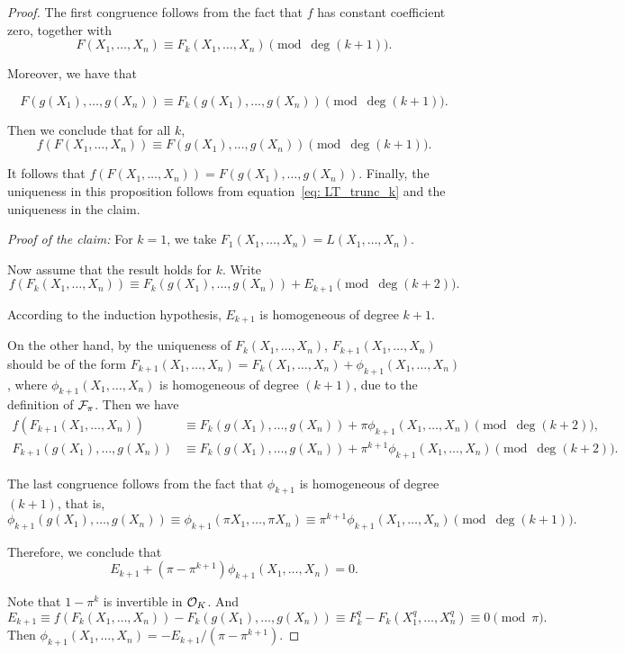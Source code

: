 \begin{proof}
    The first congruence follows from the fact that $f$ has constant coefficient zero, together with
    \begin{equation}
        F(X_1, \ldots, X_n) \equiv F_k(X_1, \ldots, X_n) \pmod{\deg (k+1)}.
        \label{eq: LT_trunc_k}
    \end{equation}

    Moreover, we have that

    \[F(g(X_1), \ldots, g(X_n)) \equiv F_k(g(X_1), \ldots, g(X_n)) \pmod{\deg (k + 1)}. \]

    Then we conclude that for all $k$,
    \[f(F(X_1, \ldots, X_n)) \equiv F(g(X_1), \ldots, g(X_n)) \pmod{\deg (k+1)}. \]

    It follows that $f(F(X_1, \ldots, X_n)) = F(g(X_1), \ldots, g(X_n))$.
    Finally, the uniqueness in this proposition follows from equation~\eqref{eq: LT_trunc_k} and the uniqueness in
    the claim.

    \textit{Proof of the claim:} For $k = 1$, we take $F_1(X_1, \ldots, X_n) = L(X_1, \ldots, X_n)$. \par
    Now assume that the result holds for $k$. Write
    \[f (F_k(X_1,\ldots, X_n )) \equiv
        F_k(g(X_1), \ldots, g(X_n)) + E_{k+1} \pmod{\deg (k+ 2)}.\]

    According to the induction hypothesis, $E_{k+1}$ is homogeneous of
    degree $k + 1$.

    On the other hand, by the uniqueness of $F_k(X_1, \ldots, X_n)$,
    $F_{k+1}(X_1,\ldots,X_n)$ should be of the form $F_{k+1}(X_1,\ldots, X_n) =
        F_k(X_1, \ldots, X_n) + \phi_{k+1}(X_1, \ldots, X_n)$, where
        $\phi_{k+1}(X_1, \ldots, X_n)$ is homogeneous of degree $(k+1)$, due to the definition of
        $\mathcal{F}_\pi$. Then we have
    \begin{align*}
        f(F_{k+1}(X_1, \ldots, X_n)) &\equiv F_k(g(X_1), \ldots, g(X_n)) +
        \pi \phi_{k+1}(X_1, \ldots, X_n) \pmod{\deg (k + 2)}, \\
        F_{k+1}(g(X_1), \ldots, g(X_n)) &\equiv  F_k(g(X_1), \ldots, g(X_n)) +
        \pi ^ {k+1} \phi_{k+1} (X_1, \ldots, X_n) \pmod{\deg (k + 2)}.
    \end{align*}

    The last congruence follows from the fact that $\phi_{k+1}$ is homogeneous of degree $(k+1)$,
    that is,
    \[\phi_{k+1} (g(X_1), \ldots, g(X_n)) \equiv \phi_{k+1}(\pi X_1, \ldots, \pi X_n)
    \equiv \pi ^ {k+1} \phi_{k+1} (X_1, \ldots, X_n) \pmod{\deg (k + 1)}. \]

    Therefore, we conclude that
    \[E_{k+1} + (\pi- \pi^{k+1}) \phi_{k+1} (X_1, \ldots, X_n) = 0.\]

    Note that $1 - \pi ^k$ is invertible in $\mathcal{O}_K$. And
    \[E_{k+1} \equiv f(F_k(X_1, \ldots, X_n)) - F_k(g(X_1), \ldots, g(X_n))
    \equiv F_k^q - F_k(X_1 ^ q, \ldots, X_n^q) \equiv 0
    \pmod{\pi}.  \]
    Then $\phi_{k+1}(X_1, \ldots, X_n) = - E_{k+1}/ (\pi - \pi^{k+1})$.
\end{proof}

